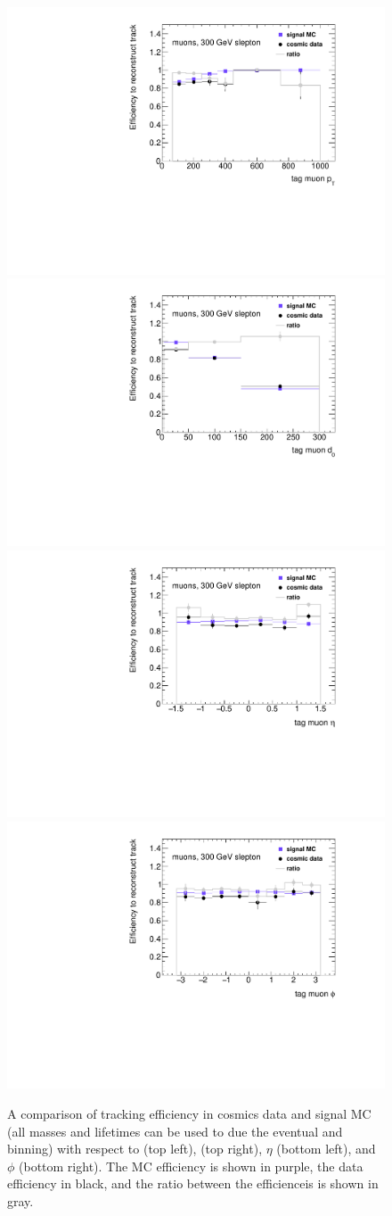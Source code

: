 \begin{figure}[htbp]
\centering
\includegraphics[width=.48\textwidth]{figures/LRT_systs/compare_pt_z0120_Rgd0_timing_idcuts_2dweight.pdf}
\includegraphics[width=.48\textwidth]{figures/LRT_systs/compare_d0_z0120_Rgd0_timing_idcuts_2dweight.pdf}
\includegraphics[width=.48\textwidth]{figures/LRT_systs/compare_eta_z0120_Rgd0_timing_idcuts_2dweight.pdf}
\includegraphics[width=.48\textwidth]{figures/LRT_systs/compare_phi_z0120_Rgd0_timing_idcuts_2dweight.pdf}
\caption{A comparison of tracking efficiency in cosmics data and signal MC (all masses and lifetimes can be used to due the eventual \pt and \dz binning) with respect to \pt (top left), \dz (top right), $\eta$ (bottom left), and $\phi$ (bottom right). The \ac{MC} efficiency is shown in purple, the data efficiency in black, and the ratio between the efficienceis is shown in gray.}
\label{fig:lrt_eff_comp}
\end{figure}

